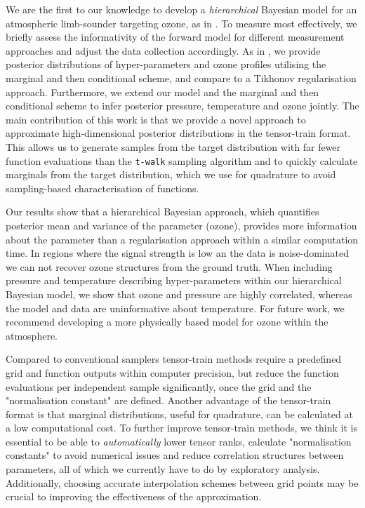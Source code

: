 We are the first to our knowledge to develop a \textit{hierarchical} Bayesian model for an atmospheric limb-sounder targeting ozone, as in \cite{mipas2000handbook}.
To measure most effectively, we briefly assess the informativity of the forward model for different measurement approaches and adjust the data collection accordingly.
As in \cite{fox2016fast}, we provide posterior distributions of hyper-parameters and ozone profiles utilising the marginal and then conditional scheme, and compare to a Tikhonov regularisation approach.
Furthermore, we extend our model and the marginal and then conditional scheme to infer posterior pressure, temperature and ozone jointly.
The main contribution of this work is that we provide a novel approach \cite{cui2022deep} to approximate high-dimensional posterior distributions in the tensor-train format.
This allows us to generate samples from the target distribution with far fewer function evaluations than the \texttt{t-walk} sampling algorithm \cite{christen2010general} and to quickly calculate marginals from the target distribution, which we use for quadrature to avoid sampling-based characterisation of functions.

Our results show that a hierarchical Bayesian approach, which quantifies posterior mean and variance of the parameter (ozone), provides more information about the parameter than a regularisation approach within a similar computation time.
In regions where the signal strength is low an the data is noise-dominated we can not recover ozone structures from the ground truth.
When including pressure and temperature describing hyper-parameters within our hierarchical Bayesian model, we show that ozone and pressure are highly correlated, whereas the model and data are uninformative about temperature.
For future work, we recommend developing a more physically based model for ozone within the atmosphere.

Compared to conventional samplers tensor-train methods require a predefined grid and function outputs within computer precision, but reduce the function evaluations per independent sample significantly, once the grid and the "normalisation constant" are defined.
Another advantage of the tensor-train format is that marginal distributions, useful for quadrature, can be calculated at a low computational cost.
To further improve tensor-train methods, we think it is essential to be able to \textit{automatically} lower tensor ranks, calculate "normalisation constants" to avoid numerical issues and reduce correlation structures between parameters, all of which we currently have to do by exploratory analysis.
Additionally, choosing accurate interpolation schemes between grid points may be crucial to improving the effectiveness of the approximation.